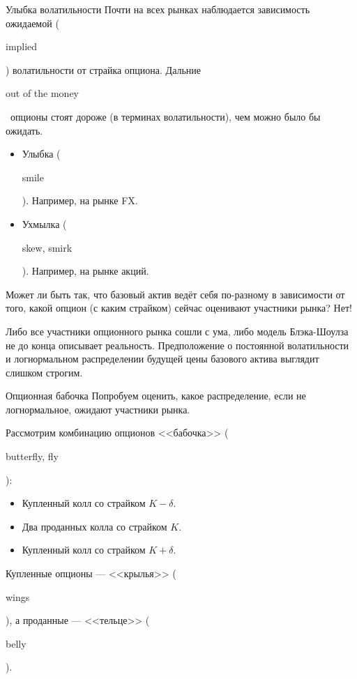 \documentclass{beamer}
\newcommand{\en}[1]{\begin{otherlanguage}{english}#1\end{otherlanguage}}
\begin{document}
\begin{frame}{Улыбка волатильности}
\justify
Почти на всех рынках наблюдается зависимость ожидаемой (\en{implied}) волатильности от страйка опциона. Дальние \en{out of the money}\ опционы стоят дороже (в терминах волатильности), чем можно было бы ожидать.
\begin{itemize}
\item Улыбка (\en{smile}). Например, на рынке FX.
\item Ухмылка (\en{skew, smirk}). Например, на рынке акций.
\end{itemize}

\justify
Может ли быть так, что базовый актив ведёт себя по-разному в зависимости от того, какой опцион (с каким страйком) сейчас оценивают участники рынка? Нет!

\justify
Либо все участники опционного рынка сошли с ума, либо модель Блэка-Шоулза не до конца описывает реальность. Предположение о постоянной волатильности и логнормальном распределении будущей цены базового актива выглядит слишком строгим.
\end{frame}



\begin{frame}{Опционная бабочка}
\justify
Попробуем оценить, какое распределение, если не логнормальное, ожидают участники рынка.

\justify
Рассмотрим комбинацию опционов <<бабочка>> (\en{butterfly, fly}):
\begin{itemize}
\item Купленный колл со страйком $K - \delta$.
\item Два проданных колла со страйком $K$.
\item Купленный колл со страйком $K + \delta$.
\end{itemize}

\justify
Купленные опционы --- <<крылья>> (\en{wings}), а проданные --- <<тельце>> (\en{belly}).
\end{frame}
\end{document}
